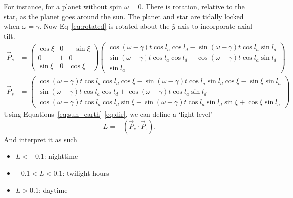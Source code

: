 \documentclass[12pt,a4paper]{article}
\begin{document}
For instance, for a planet without spin \(\omega = 0\). There is rotation, relative to the star, as the planet goes around the sun. The planet and star are tidally locked when \(\omega=\gamma\). Now Eq~\eqref{eq:rotated} is rotated about the \(\hat{y}\)-axis to incorporate axial tilt. 
\begin{align}
\vec{P}_{s} &= \left(\begin{array}{ccc}\cos\xi  & 0 & -\sin\xi \\ 0 & 1 & 0 \\ \sin\xi & 0 & \cos\xi \end{array}\right)\left(\begin{array}{c} \cos(\omega-\gamma)t\cos l_{a}\cos l_{d} - \sin(\omega-\gamma)t\cos l_{a}\sin l_{d} \\ \sin(\omega - \gamma)t\cos l_{a}\cos l_{d} + \cos(\omega-\gamma)t\cos l_{a}\sin l_{d} \\ \sin l_{a} \end{array}\right) \\
\vec{P}_{s} &= \left(\begin{array}{c} \cos(\omega-\gamma)t\cos l_{a}\cos l_{d}\cos\xi - \sin(\omega-\gamma)t\cos l_{a}\sin l_{d}\cos\xi -\sin\xi\sin l_{a} \\ \sin(\omega - \gamma)t\cos l_{a}\cos l_{d} + \cos(\omega-\gamma)t\cos l_{a}\sin l_{d} \\ \cos(\omega-\gamma)t\cos l_{a}\cos l_{d}\sin\xi - \sin(\omega-\gamma)t\cos l_{a}\sin l_{d}\sin\xi + \cos\xi\sin l_{a} \end{array}\right) \label{eq:dir}
\end{align}
Using Equations~\eqref{eq:sun_earth}-\eqref{eq:dir}, we can define a `light level'
\begin{equation}
L = -(\vec{P}_{e}\cdot \vec{P}_{s}).
\end{equation}
And interpret it as such
\begin{itemize}
	\item \(L < -0.1\): nighttime
	\item \(-0.1 < L < 0.1\): twilight hours
	\item \(L>0.1\): daytime 
\end{itemize}
\end{document}

